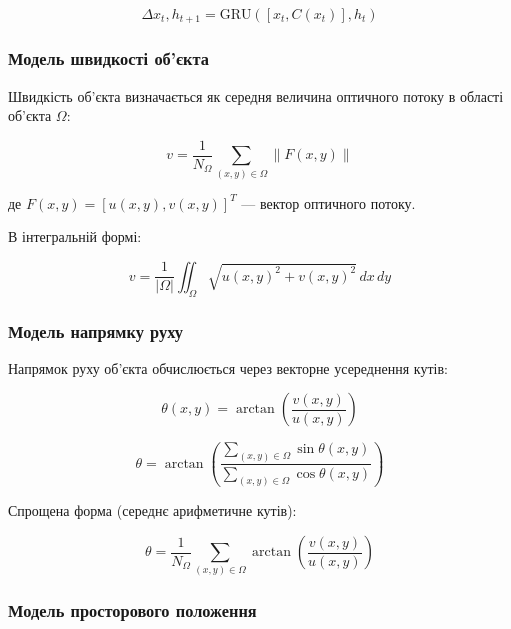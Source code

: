 \documentclass[14pt, a4paper]{extarticle}
\numberwithin{equation}{section}
\begin{document}
\begin{equation}
\Delta x_t, h_{t+1} = \text{GRU}([x_t, C(x_t)], h_t) \tag{30}
\end{equation}

\subsubsection{Модель швидкості об'єкта}

Швидкість об'єкта визначається як середня величина оптичного потоку в області об'єкта $\Omega$:

\begin{equation}
\boxed{v = \frac{1}{N_\Omega} \sum_{(x,y) \in \Omega} \|F(x,y)\|} \tag{31}
\end{equation}

де $F(x,y) = [u(x,y), v(x,y)]^T$ — вектор оптичного потоку.

В інтегральній формі:

\begin{equation}
v = \frac{1}{|\Omega|} \iint_{\Omega} \sqrt{u(x,y)^2 + v(x,y)^2} \, dx\,dy \tag{32}
\end{equation}

\subsubsection{Модель напрямку руху}

Напрямок руху об'єкта обчислюється через векторне усереднення кутів:

\begin{equation}
\theta(x,y) = \arctan\left( \frac{v(x,y)}{u(x,y)} \right) \tag{33}
\end{equation}

\begin{equation}
\boxed{\theta = \arctan\left( \frac{\sum_{(x,y) \in \Omega} \sin\theta(x,y)}{\sum_{(x,y) \in \Omega} \cos\theta(x,y)} \right)} \tag{34}
\end{equation}

Спрощена форма (середнє арифметичне кутів):

\begin{equation}
\theta = \frac{1}{N_\Omega} \sum_{(x,y) \in \Omega} \arctan\left( \frac{v(x,y)}{u(x,y)} \right) \tag{35}
\end{equation}

\subsubsection{Модель просторового положення}
\end{document}
